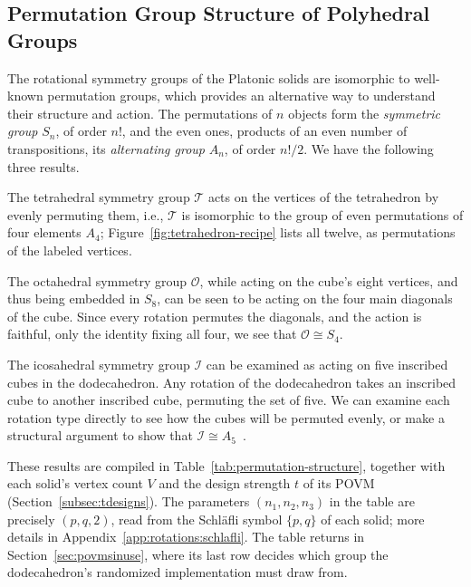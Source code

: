 \documentclass[11pt, oneside, openany]{scrbook}
\newcommand{\Tgroup}{\mathcal{T}}  %
\newcommand{\Ogroup}{\mathcal{O}}  %
\newcommand{\Igroup}{\mathcal{I}}  %
\begin{document}
\subsection{Permutation Group Structure of Polyhedral Groups}

The rotational symmetry groups of the Platonic solids are isomorphic to well-known permutation groups, which provides an alternative way to understand their structure and action. The permutations of $n$ objects form the \textit{symmetric group} $S_n$, of order $n!$, and the even ones, products of an even number of transpositions, its \textit{alternating group} $A_n$, of order $n!/2$. We have the following three results.

The tetrahedral symmetry group $\Tgroup$ acts on the vertices of the tetrahedron by evenly permuting them, i.e., $\Tgroup$ is isomorphic to the group of even permutations of four elements $A_4$; Figure~\ref{fig:tetrahedron-recipe} lists all twelve, as permutations of the labeled vertices.

The octahedral symmetry group $\Ogroup$, while acting on the cube's eight vertices, and thus being embedded in $S_8$, can be seen to be acting on the four main diagonals of the cube. Since every rotation permutes the diagonals, and the action is faithful, only the identity fixing all four, we see that $\Ogroup \cong S_4$.

The icosahedral symmetry group $\Igroup$ can be examined as acting on five inscribed cubes in the dodecahedron. Any rotation of the dodecahedron takes an inscribed cube to another inscribed cube, permuting the set of five. We can examine each rotation type directly to see how the cubes will be permuted evenly, or make a structural argument to show that $\Igroup \cong A_5$~\cite[Thm.~7.4.4]{artin2011algebra}.

These results are compiled in Table~\ref{tab:permutation-structure}, together with each solid's vertex count $V$ and the design strength $t$ of its POVM (Section~\ref{subsec:tdesigns}). The parameters $(n_1, n_2, n_3)$ in the table are precisely $(p, q, 2)$, read from the Schl\"{a}fli symbol $\{p,q\}$ of each solid; more details in Appendix~\ref{app:rotations:schlafli}. The table returns in Section~\ref{sec:povmsinuse}, where its last row decides which group the dodecahedron's randomized implementation must draw from.
\end{document}
